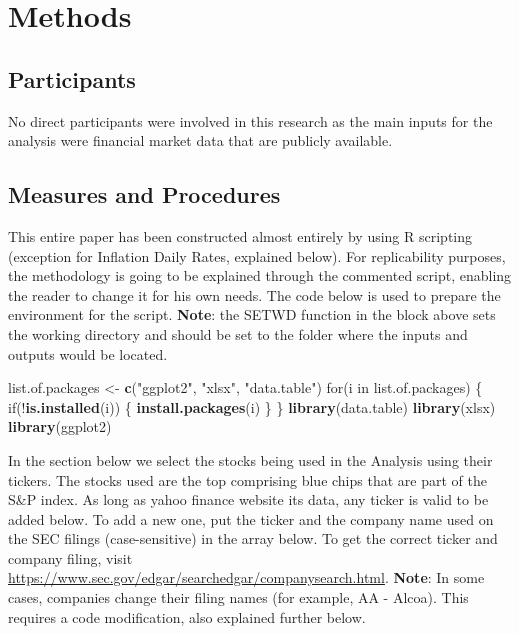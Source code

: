 \documentclass[english,man]{apa6}
\newenvironment{Shaded}{\begin{snugshade}}{\end{snugshade}}
\newcommand{\KeywordTok}[1]{\textcolor[rgb]{0.13,0.29,0.53}{\textbf{{#1}}}}
\newcommand{\StringTok}[1]{\textcolor[rgb]{0.31,0.60,0.02}{{#1}}}
\newcommand{\NormalTok}[1]{{#1}}
\begin{document}
\section{Methods}\label{methods}

\subsection{Participants}\label{participants}

No direct participants were involved in this research as the main inputs
for the analysis were financial market data that are publicly available.

\subsection{Measures and Procedures}\label{measures-and-procedures}

This entire paper has been constructed almost entirely by using R
scripting (exception for Inflation Daily Rates, explained below). For
replicability purposes, the methodology is going to be explained through
the commented script, enabling the reader to change it for his own
needs. The code below is used to prepare the environment for the script.
\textbf{Note}: the SETWD function in the block above sets the working
directory and should be set to the folder where the inputs and outputs
would be located.

\begin{Shaded}
\begin{Highlighting}[]
\NormalTok{list.of.packages <-}\StringTok{ }\KeywordTok{c}\NormalTok{(}\StringTok{"ggplot2"}\NormalTok{, }\StringTok{"xlsx"}\NormalTok{, }\StringTok{"data.table"}\NormalTok{)}
\NormalTok{for(i in list.of.packages) \{}
  \NormalTok{if(!}\KeywordTok{is.installed}\NormalTok{(i)) \{}
  \KeywordTok{install.packages}\NormalTok{(i)}
  \NormalTok{\}}
\NormalTok{\}}
\KeywordTok{library}\NormalTok{(data.table)}
\KeywordTok{library}\NormalTok{(xlsx)}
\KeywordTok{library}\NormalTok{(ggplot2)}
\end{Highlighting}
\end{Shaded}

In the section below we select the stocks being used in the Analysis
using their tickers. The stocks used are the top comprising blue chips
that are part of the S\&P index. As long as yahoo finance website its
data, any ticker is valid to be added below. To add a new one, put the
ticker and the company name used on the SEC filings (case-sensitive) in
the array below. To get the correct ticker and company filing, visit
\url{https://www.sec.gov/edgar/searchedgar/companysearch.html}.
\textbf{Note}: In some cases, companies change their filing names (for
example, AA - Alcoa). This requires a code modification, also explained
further below.
\end{document}
